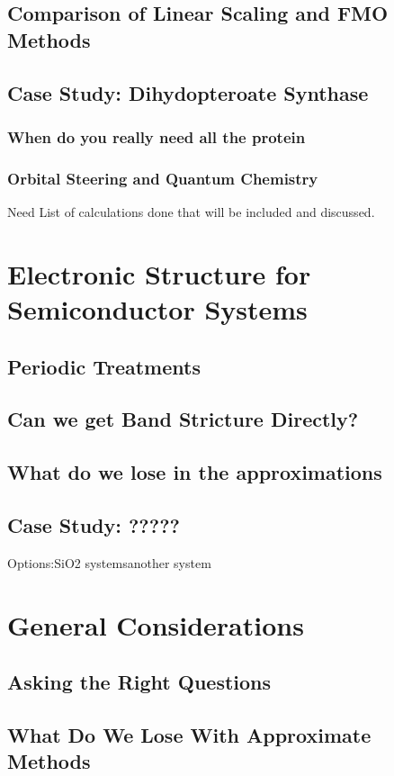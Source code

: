 \documentclass[oneside,12pt]{book}
\begin{document}
\section{Comparison of Linear Scaling and FMO Methods}
\section{Case Study: Dihydopteroate Synthase}
\subsection{When do you really need all the protein}
\subsection{Orbital Steering and Quantum Chemistry}
Need List of calculations done that will be included and discussed.

\chapter{Electronic Structure for Semiconductor Systems}
\section{Periodic Treatments}
\section{Can we get Band Stricture Directly?}
\section{What do we lose in the approximations}
\section{Case Study: ?????}
Options:SiO2 systemsanother system

\chapter{General Considerations}
\section{Asking the Right Questions}
\section{What Do We Lose With Approximate Methods}
\end{document}
